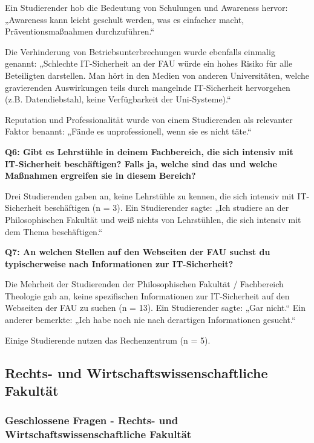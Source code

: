 \documentclass[german,report]{i1thesis}
\begin{document}
Ein Studierender hob die Bedeutung von Schulungen und Awareness hervor: „Awareness kann leicht geschult werden, was es einfacher macht, Präventionsmaßnahmen durchzuführen.“

Die Verhinderung von Betriebsunterbrechungen wurde ebenfalls einmalig genannt: „Schlechte IT-Sicherheit an der FAU würde ein hohes Risiko für alle Beteiligten darstellen. Man hört in den Medien von anderen Universitäten, welche gravierenden Auswirkungen teils durch mangelnde IT-Sicherheit hervorgehen (z.B. Datendiebstahl, keine Verfügbarkeit der Uni-Systeme).“

Reputation und Professionalität wurde von einem Studierenden als relevanter Faktor benannt: „Fände es unprofessionell, wenn sie es nicht täte.“

\textbf{Q6: Gibt es Lehrstühle in deinem Fachbereich, die sich intensiv mit IT-Sicherheit beschäftigen? Falls ja, welche sind das und welche Maßnahmen ergreifen sie in diesem Bereich?}

Drei Studierenden gaben an, keine Lehrstühle zu kennen, die sich intensiv mit IT-Sicherheit beschäftigen (n = 3). Ein Studierender sagte: „Ich studiere an der Philosophischen Fakultät und weiß nichts von Lehrstühlen, die sich intensiv mit dem Thema beschäftigen.“

\textbf{Q7: An welchen Stellen auf den Webseiten der FAU suchst du typischerweise nach Informationen zur IT-Sicherheit?}

Die Mehrheit der Studierenden der Philosophischen Fakultät / Fachbereich Theologie gab an, keine spezifischen Informationen zur IT-Sicherheit auf den Webseiten der FAU zu suchen (n = 13). Ein Studierender sagte: „Gar nicht.“ Ein anderer bemerkte: „Ich habe noch nie nach derartigen Informationen gesucht.“

Einige Studierende nutzen das Rechenzentrum (n = 5).

\subsection{Rechts- und Wirtschaftswissenschaftliche Fakultät}

\subsubsection{Geschlossene Fragen - Rechts- und Wirtschaftswissenschaftliche Fakultät}
\end{document}
